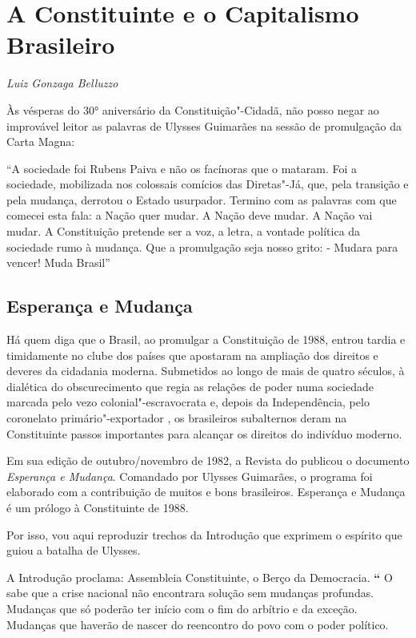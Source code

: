 \chapter{A Constituinte e o Capitalismo Brasileiro}

\begin{flushright}
\emph{Luiz Gonzaga Belluzzo}
\end{flushright}

Às vésperas do 30° aniversário da Constituição"-Cidadã, não posso negar
ao improvável leitor as palavras de Ulysses Guimarães na sessão de
promulgação da Carta Magna:

``A sociedade foi Rubens Paiva e não os facínoras que o mataram. Foi a
sociedade, mobilizada nos colossais comícios das Diretas"-Já, que, pela
transição e pela mudança, derrotou o Estado usurpador. Termino com as
palavras com que comecei esta fala: a Nação quer mudar. A Nação deve
mudar. A Nação vai mudar. A Constituição pretende ser a voz, a letra, a
vontade política da sociedade rumo à mudança. Que a promulgação seja
nosso grito: - Mudara para vencer! Muda Brasil''

\section{Esperança e Mudança}

Há quem diga que o Brasil, ao promulgar a Constituição de 1988, entrou
tardia e timidamente no clube dos países que apostaram na ampliação dos
direitos e deveres da cidadania moderna. Submetidos ao longo de mais de
quatro séculos, à dialética do obscurecimento que regia as relações de
poder numa sociedade marcada pelo vezo colonial"-escravocrata e, depois
da Independência, pelo coronelato primário"-exportador , os brasileiros
subalternos deram na Constituinte passos importantes para alcançar os
direitos do indivíduo moderno.

Em sua edição de outubro/novembro de 1982, a Revista do  publicou o
documento \emph{Esperança e Mudança}. Comandado por Ulysses Guimarães, o
programa foi elaborado com a contribuição de muitos e bons brasileiros.
Esperança e Mudança é um prólogo à Constituinte de 1988.

Por isso, vou aqui reproduzir trechos da Introdução que exprimem o
espírito que guiou a batalha de Ulysses.

A Introdução proclama: Assembleia Constituinte, o Berço da Democracia.
\textbf{``} O  sabe que a crise nacional não encontrara solução sem
mudanças profundas. Mudanças que só poderão ter início com o fim do
arbítrio e da exceção. Mudanças que haverão de nascer do reencontro do
povo com o poder político.

